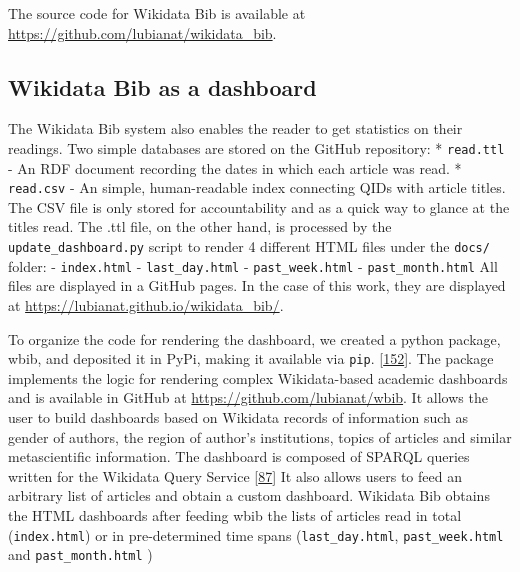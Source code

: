 The source code for Wikidata Bib is available at \url{https://github.com/lubianat/wikidata_bib}.

\hypertarget{wikidata-bib-as-a-dashboard}{%
\subsection{Wikidata Bib as a dashboard}\label{wikidata-bib-as-a-dashboard}}

The Wikidata Bib system also enables the reader to get statistics on their readings.
Two simple databases are stored on the GitHub repository:
* \texttt{read.ttl} - An RDF document recording the dates in which each article was read.
* \texttt{read.csv} - An simple, human-readable index connecting QIDs with article titles.
The CSV file is only stored for accountability and as a quick way to glance at the titles read.
The .ttl file, on the other hand, is processed by the \texttt{update\_dashboard.py} script to render 4 different HTML files under the \texttt{docs/} folder:
- \texttt{index.html}
- \texttt{last\_day.html}
- \texttt{past\_week.html}
- \texttt{past\_month.html}
All files are displayed in a GitHub pages.
In the case of this work, they are displayed at \url{https://lubianat.github.io/wikidata_bib/}.

To organize the code for rendering the dashboard, we created a python package, wbib, and deposited it in PyPi, making it available via \texttt{pip}. {[}\protect\hyperlink{ref-6chnW6cc}{152}{]}.
The package implements the logic for rendering complex Wikidata-based academic dashboards and is available in GitHub at \url{https://github.com/lubianat/wbib}.
It allows the user to build dashboards based on Wikidata records of information such as gender of authors, the region of author's institutions, topics of articles and similar metascientific information.
The dashboard is composed of SPARQL queries written for the Wikidata Query Service {[}\protect\hyperlink{ref-2wDsXBwd}{87}{]}
It also allows users to feed an arbitrary list of articles and obtain a custom dashboard.
Wikidata Bib obtains the HTML dashboards after feeding wbib the lists of articles read in total (\texttt{index.html}) or in pre-determined time spans (\texttt{last\_day.html}, \texttt{past\_week.html} and \texttt{past\_month.html} )

